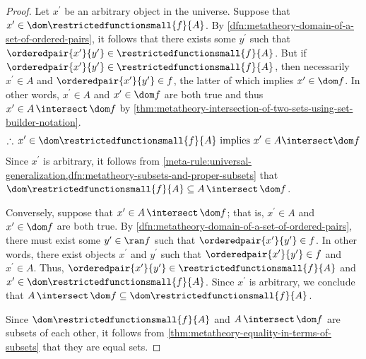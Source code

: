 \begin{proof}
    Let \( x^{\prime} \) be an arbitrary object in the universe.
    Suppose that \( x^{\prime} \in \dom \restrictedfunctionsmall{f}{A} \).
    By \cref{dfn:metatheory-domain-of-a-set-of-ordered-pairs}, it follows that there exists some \( y^{\prime} \)
    such that \( \orderedpair{x^{\prime}}{y^{\prime}} \in \restrictedfunctionsmall{f}{A} \).
    But if \( \orderedpair{x^{\prime}}{y^{\prime}} \in \restrictedfunctionsmall{f}{A} \),
    then necessarily \( x^{\prime} \in A \) and \( \orderedpair{x^{\prime}}{y^{\prime}} \in f \), the latter of which
    implies \( x^{\prime} \in \dom f \).
    In other words, \( x^{\prime} \in A \) and \( x^{\prime} \in \dom f \) are both true
    and thus \( x^{\prime} \in A \,{\intersect}\, \dom f \) by \cref{thm:metatheory-intersection-of-two-sets-using-set-builder-notation}.
    \begin{equation*}
        \therefore \, x^{\prime} \in \dom \restrictedfunctionsmall{f}{A} \ \text{implies} \ x^{\prime} \in A \intersect \dom f
    \end{equation*}
    Since \( x^{\prime} \) is arbitrary, it follows from \cref{meta-rule:universal-generalization,dfn:metatheory-subsets-and-proper-subsets} that
    \( \dom \restrictedfunctionsmall{f}{A} \subseteq A \,{\intersect}\, \dom f \).

    \vspace{0.3cm}
    \noindent
    Conversely, suppose that \( x^{\prime} \in A \,{\intersect}\, \dom f \); that is, \( x^{\prime} \in A \) and \( x^{\prime} \in \dom f \)
    are both true.
    By \cref{dfn:metatheory-domain-of-a-set-of-ordered-pairs}, there must exist some \( y^{\prime} \in \ran f \) such that \( \orderedpair{x^{\prime}}{y^{\prime}} \in f \).
    In other words, there exist objects \( x^{\prime} \) and \( y^{\prime} \) such that \( \orderedpair{x^{\prime}}{y^{\prime}} \in f \) and
    \( x^{\prime} \in A \).
    Thus, \( \orderedpair{x^{\prime}}{y^{\prime}} \in \restrictedfunctionsmall{f}{A} \) and \( x^{\prime} \in \dom \restrictedfunctionsmall{f}{A} \).
    Since \( x^{\prime} \) is arbitrary, we conclude that \( A \,{\intersect}\, \dom f \subseteq \dom \restrictedfunctionsmall{f}{A} \).

    \vspace{0.3cm}
    \noindent
    Since \( \dom \restrictedfunctionsmall{f}{A} \) and \( A \,{\intersect}\, \dom f \) are subsets of each other, it follows from
    \cref{thm:metatheory-equality-in-terms-of-subsets} that they are equal sets.
\end{proof}

